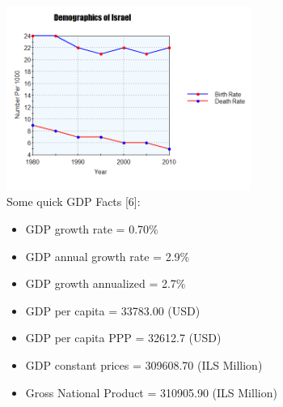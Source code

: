 \documentclass[10pt]{article}
\begin{document}
\includegraphics[width=8cm, height=6cm]{birthrate.png}
\\
Some quick GDP Facts [6]:
\begin{itemize}
	\item GDP growth rate = 0.70\%
	\item GDP annual growth rate = 2.9\%
	\item GDP growth annualized = 2.7\%
	\item GDP per capita = 33783.00 (USD)
	\item GDP per capita PPP = 32612.7 (USD)
	\item GDP constant prices = 309608.70 (ILS Million)
	\item Gross National Product = 310905.90 (ILS Million)
\end{itemize}
\end{document}
